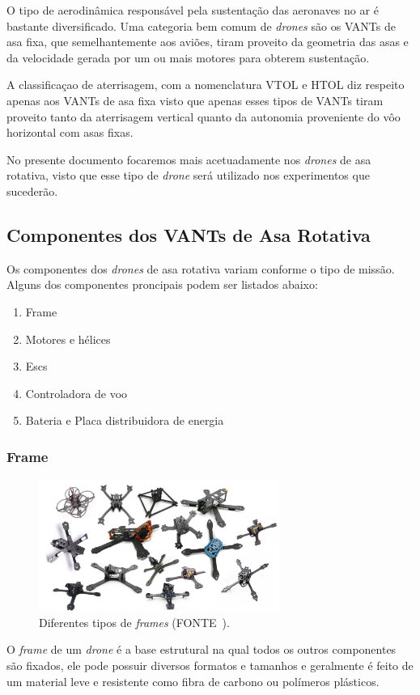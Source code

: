 \documentclass[12pt,a4paper,oneside]{book}
\begin{document}
O tipo de aerodinâmica responsável pela sustentação das aeronaves no ar é bastante diversificado. Uma categoria bem comum de \textit{drones} são os VANTs de asa fixa, que semelhantemente aos aviões, tiram proveito da geometria das asas e da velocidade gerada por um ou mais motores para obterem sustentação. 

A classificaçao de aterrisagem, com a nomenclatura VTOL e HTOL diz respeito apenas aos VANTs de asa fixa visto que apenas esses tipos de VANTs tiram proveito tanto da aterrisagem vertical quanto da autonomia proveniente do vôo horizontal com asas fixas. 

No presente documento focaremos mais acetuadamente nos \textit{drones} de asa rotativa, visto que esse tipo de \textit{drone} será utilizado nos experimentos que sucederão.

\subsection{Componentes dos VANTs de Asa Rotativa}

Os componentes dos \textit{drones} de asa rotativa variam conforme o tipo de missão. Alguns dos componentes proncipais podem ser listados abaixo:

\begin{enumerate}
  \item Frame
  \item Motores e hélices
  \item Escs
  \item Controladora de voo
  \item Bateria e Placa distribuidora de energia
\end{enumerate}

\newpage

\subsubsection*{Frame}
\begin{figure}[H]
  \centering
  \includegraphics[width=0.7\textwidth]{Images/introducao/different_frames.jpg}
  \caption{Diferentes tipos de \textit{frames} (FONTE~\cite{url:esc_pwm}).}
  \label{fig:different_frames.jpg.0}
\end{figure}
%
O \textit{frame} de um \textit{drone} é a base estrutural na qual todos os outros componentes são fixados, ele pode possuir diversos formatos e tamanhos e geralmente é feito de um material leve e resistente como fibra de carbono ou polímeros plásticos. 
\end{document}

